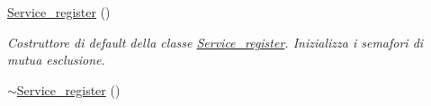 \begin{DoxyCompactItemize}
\item 
\hypertarget{class_service__register_a5713def23a52276752bf518527b9735c}{\hyperlink{class_service__register_a5713def23a52276752bf518527b9735c}{Service\-\_\-register} ()}\label{class_service__register_a5713def23a52276752bf518527b9735c}

\begin{DoxyCompactList}\small\item\em Costruttore di default della classe \hyperlink{class_service__register}{Service\-\_\-register}. Inizializza i semafori di mutua esclusione. \end{DoxyCompactList}\item 
\hypertarget{class_service__register_a7a2d852e303fb6019871ba62eb5a9c8b}{\hyperlink{class_service__register_a7a2d852e303fb6019871ba62eb5a9c8b}{$\sim$\-Service\-\_\-register} ()}\label{class_service__register_a7a2d852e303fb6019871ba62eb5a9c8b}


\end{DoxyCompactItemize}
